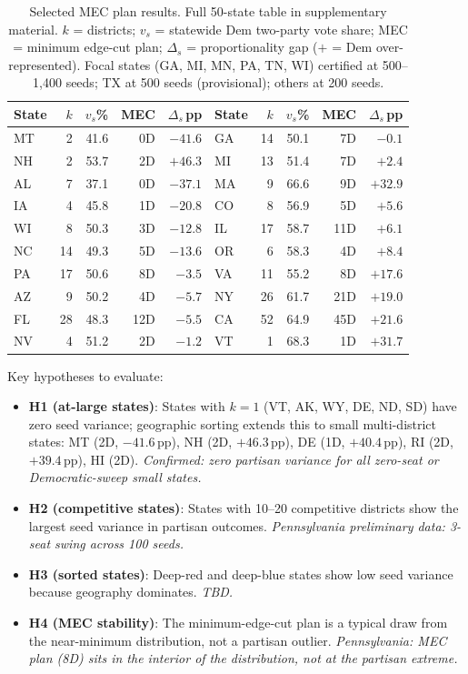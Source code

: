 \begin{table}[h]
\centering\small
\begin{tabular}{lrrrr|lrrrr}
\toprule
State & $k$ & $v_s$\% & MEC & $\Delta_s$\,pp
& State & $k$ & $v_s$\% & MEC & $\Delta_s$\,pp \\
\midrule
MT & 2 & 41.6 & 0D & $-41.6$ & GA & 14 & 50.1 & 7D & $-0.1$  \\
NH & 2 & 53.7 & 2D & $+46.3$ & MI & 13 & 51.4 & 7D & $+2.4$  \\
AL & 7 & 37.1 & 0D & $-37.1$ & MA &  9 & 66.6 & 9D & $+32.9$ \\
IA & 4 & 45.8 & 1D & $-20.8$ & CO &  8 & 56.9 & 5D & $+5.6$  \\
WI & 8 & 50.3 & 3D & $-12.8$ & IL & 17 & 58.7 &11D & $+6.1$  \\
NC &14 & 49.3 & 5D & $-13.6$ & OR &  6 & 58.3 & 4D & $+8.4$  \\
PA &17 & 50.6 & 8D & $-3.5$  & VA & 11 & 55.2 & 8D & $+17.6$ \\
AZ &  9 & 50.2 & 4D & $-5.7$  & NY & 26 & 61.7 &21D & $+19.0$ \\
FL &28 & 48.3 &12D & $-5.5$  & CA & 52 & 64.9 &45D & $+21.6$ \\
NV &  4 & 51.2 & 2D & $-1.2$  & VT &  1 & 68.3 & 1D & $+31.7$ \\
\bottomrule
\end{tabular}
\caption{Selected MEC plan results. Full 50-state table in supplementary material.
  $k$ = districts; $v_s$ = statewide Dem two-party vote share; MEC = minimum
  edge-cut plan; $\Delta_s$ = proportionality gap ($+$ = Dem over-represented).
  Focal states (GA, MI, MN, PA, TN, WI) certified at 500--1{,}400 seeds;
  TX at 500 seeds (provisional); others at 200 seeds.}
\label{tab:national}
\end{table}

Key hypotheses to evaluate:
\begin{itemize}
  \item \textbf{H1 (at-large states)}: States with $k=1$ (VT, AK, WY, DE, ND,
        SD) have zero seed variance; geographic sorting extends this to small
        multi-district states: MT (2D, $-41.6$\,pp), NH (2D, $+46.3$\,pp),
        DE (1D, $+40.4$\,pp), RI (2D, $+39.4$\,pp), HI (2D).
        \emph{Confirmed: zero partisan variance for all zero-seat or
        Democratic-sweep small states.}
  \item \textbf{H2 (competitive states)}: States with 10--20 competitive
        districts show the largest seed variance in partisan outcomes.
        \emph{Pennsylvania preliminary data: 3-seat swing across 100 seeds.}
  \item \textbf{H3 (sorted states)}: Deep-red and deep-blue states show low
        seed variance because geography dominates. \emph{TBD.}
  \item \textbf{H4 (MEC stability)}: The minimum-edge-cut plan is a typical
        draw from the near-minimum distribution, not a partisan outlier.
        \emph{Pennsylvania: MEC plan (8D) sits in the interior of the
        distribution, not at the partisan extreme.}
\end{itemize}
